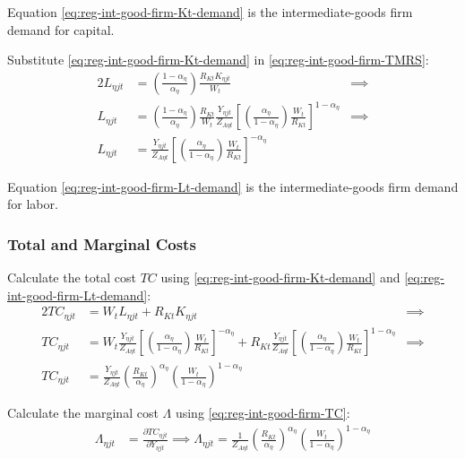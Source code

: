 \documentclass[../thesis.tex]{subfiles}
\begin{document}
Equation \ref{eq:reg-int-good-firm-Kt-demand} is the intermediate-goods firm demand for capital. 

Substitute \ref{eq:reg-int-good-firm-Kt-demand} in \ref{eq:reg-int-good-firm-TMRS}:
\begin{alignat}{2}
	L_{\eta jt} & = \left( \frac{1-{\alpha_{\eta}}}{{\alpha_{\eta}}} \right) \frac{R_{Kt} K_{\eta jt}}{W_t} &\implies \nonumber \\
	L_{\eta jt} & = \left( \frac{1-{\alpha_{\eta}}}{{\alpha_{\eta}}} \right) \frac{R_{Kt}}{W_t} \frac{Y_{\eta jt}}{Z_{A\eta t}} \left[ \left( \frac{{\alpha_{\eta}}}{1-{\alpha_{\eta}}} \right) \frac{W_t}{R_{Kt}}\right]^{1-{\alpha_{\eta}}} &\implies \nonumber \\
	L_{\eta jt} & = \frac{Y_{\eta jt}}{Z_{A\eta t}} \left[ \left( \frac{{\alpha_{\eta}}}{1-{\alpha_{\eta}}} \right) \frac{W_t}{R_{Kt}}\right]^{-{\alpha_{\eta}}} \label{eq:reg-int-good-firm-Lt-demand}
\end{alignat}

Equation \ref{eq:reg-int-good-firm-Lt-demand} is the intermediate-goods firm demand for labor.

\subsubsection*{Total and Marginal Costs}

Calculate the total cost $TC$ using \ref{eq:reg-int-good-firm-Kt-demand} and \ref{eq:reg-int-good-firm-Lt-demand}:
\begin{alignat}{2}
	TC_{\eta jt} & = W_t L_{\eta jt} + R_{Kt} K_{\eta jt} &\implies \nonumber \\
	TC_{\eta jt} & = W_t \frac{Y_{\eta jt}}{Z_{A\eta t}} \left[ \left( \frac{{\alpha_{\eta}}}{1-{\alpha_{\eta}}} \right) \frac{W_t}{R_{Kt}} \right]^{-{\alpha_{\eta}}} + R_{Kt} \frac{Y_{\eta jt}}{Z_{A\eta t}} \left[ \left( \frac{{\alpha_{\eta}}}{1-{\alpha_{\eta}}} \right) \frac{W_t}{R_{Kt}} \right]^{1-{\alpha_{\eta}}} &\implies \nonumber \\
	TC_{\eta jt} & = \frac{Y_{\eta jt}}{Z_{A\eta t}} \left( \frac{R_{Kt}}{{\alpha_{\eta}}} \right)^{{\alpha_{\eta}}} \left( \frac{W_t}{1-{\alpha_{\eta}}} \right)^{1-{\alpha_{\eta}}} \label{eq:reg-int-good-firm-TC}
\end{alignat}


Calculate the marginal cost $\Lambda$ using \ref{eq:reg-int-good-firm-TC}: 
\begin{align}
	\Lambda_{\eta jt} & = \frac{\partial TC_{\eta jt}}{\partial Y_{\eta jt}} \implies 
	\Lambda_{\eta jt} = \frac{1}{Z_{A\eta t}} \left( \frac{R_{Kt}}{{\alpha_{\eta}}} \right)^{{\alpha_{\eta}}} \left( \frac{W_t}{1-{\alpha_{\eta}}} \right)^{1-{\alpha_{\eta}}} \label{eq:reg-int-good-firm-MC}
\end{align}
\end{document}
